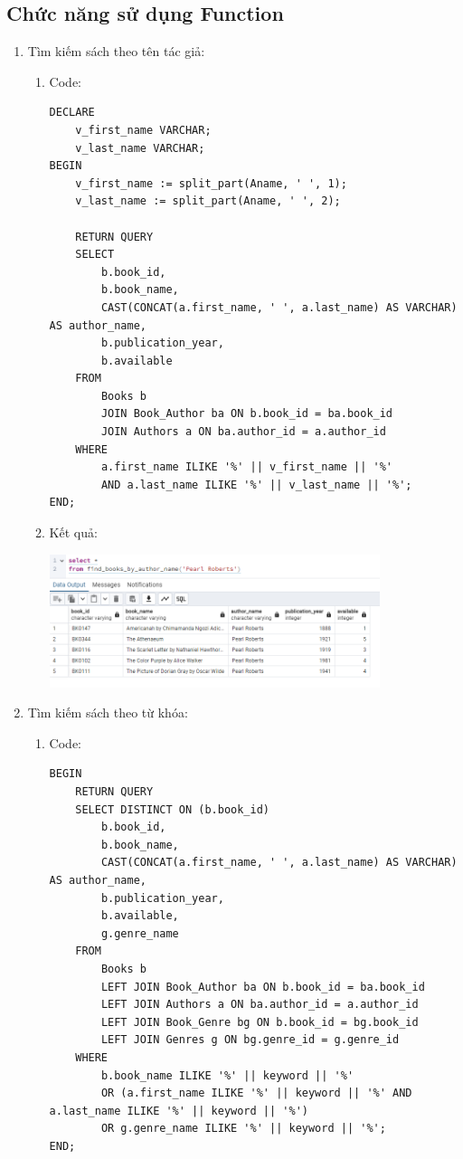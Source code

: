 \documentclass[12pt]{article}
\begin{document}
\subsection{Chức năng sử dụng Function}
\begin{enumerate}
    \item Tìm kiếm sách theo tên tác giả:
    \begin{enumerate}
        \item Code:
        
        \begin{lstlisting}
DECLARE
    v_first_name VARCHAR;
    v_last_name VARCHAR;
BEGIN
    v_first_name := split_part(Aname, ' ', 1);
    v_last_name := split_part(Aname, ' ', 2);

    RETURN QUERY
    SELECT
        b.book_id,
        b.book_name,
        CAST(CONCAT(a.first_name, ' ', a.last_name) AS VARCHAR) AS author_name,
        b.publication_year,
        b.available
    FROM
        Books b
        JOIN Book_Author ba ON b.book_id = ba.book_id
        JOIN Authors a ON ba.author_id = a.author_id
    WHERE
        a.first_name ILIKE '%' || v_first_name || '%'
        AND a.last_name ILIKE '%' || v_last_name || '%';
END;
        \end{lstlisting}

        \item Kết quả:
        
        \includegraphics[width= 0.8\textwidth]{Screenshot 2024-06-22 164310.png}
    \end{enumerate}
        \item Tìm kiếm sách theo từ khóa:
    \begin{enumerate}
        \item Code:
        
        \begin{lstlisting}
BEGIN
    RETURN QUERY
    SELECT DISTINCT ON (b.book_id)
        b.book_id,
        b.book_name,
        CAST(CONCAT(a.first_name, ' ', a.last_name) AS VARCHAR) AS author_name,
        b.publication_year,
        b.available,
        g.genre_name
    FROM
        Books b
        LEFT JOIN Book_Author ba ON b.book_id = ba.book_id
        LEFT JOIN Authors a ON ba.author_id = a.author_id
        LEFT JOIN Book_Genre bg ON b.book_id = bg.book_id
        LEFT JOIN Genres g ON bg.genre_id = g.genre_id
    WHERE
        b.book_name ILIKE '%' || keyword || '%'
        OR (a.first_name ILIKE '%' || keyword || '%' AND a.last_name ILIKE '%' || keyword || '%')
        OR g.genre_name ILIKE '%' || keyword || '%';
END;
        \end{lstlisting}


\end{enumerate}
\end{enumerate}
\end{document}
